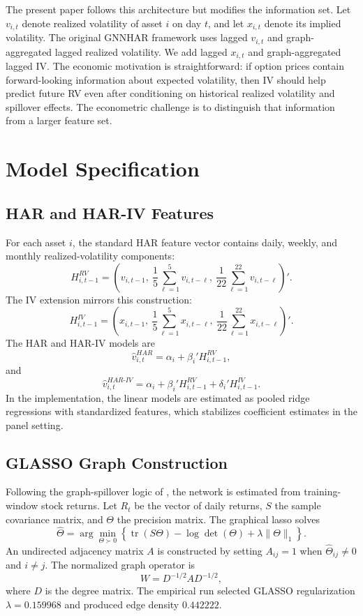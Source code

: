 \documentclass[11pt,a4paper]{article}
\begin{document}
The present paper follows this architecture but modifies the information set. Let \(v_{i,t}\) denote
realized volatility of asset \(i\) on day \(t\), and let \(x_{i,t}\) denote its implied volatility. The
original GNNHAR framework uses lagged \(v_{i,t}\) and graph-aggregated lagged realized
volatility. We add lagged \(x_{i,t}\) and graph-aggregated lagged IV. The economic motivation is
straightforward: if option prices contain forward-looking information about expected volatility,
then IV should help predict future RV even after conditioning on historical realized volatility
and spillover effects. The econometric challenge is to distinguish that information from a larger
feature set.

\section{Model Specification}

\subsection{HAR and HAR-IV Features}

For each asset \(i\), the standard HAR feature vector contains daily, weekly, and monthly
realized-volatility components:
\[
H^{RV}_{i,t-1}
= \left(v_{i,t-1},\ \frac{1}{5}\sum_{\ell=1}^{5}v_{i,t-\ell},\
\frac{1}{22}\sum_{\ell=1}^{22}v_{i,t-\ell}\right)' .
\]
The IV extension mirrors this construction:
\[
H^{IV}_{i,t-1}
= \left(x_{i,t-1},\ \frac{1}{5}\sum_{\ell=1}^{5}x_{i,t-\ell},\
\frac{1}{22}\sum_{\ell=1}^{22}x_{i,t-\ell}\right)' .
\]
The HAR and HAR-IV models are
\[
\widehat v_{i,t}^{HAR}
= \alpha_i + \beta_i' H^{RV}_{i,t-1},
\]
and
\[
\widehat v_{i,t}^{HAR\text{-}IV}
= \alpha_i + \beta_i' H^{RV}_{i,t-1} + \delta_i' H^{IV}_{i,t-1}.
\]
In the implementation, the linear models are estimated as pooled ridge regressions with
standardized features, which stabilizes coefficient estimates in the panel setting.

\subsection{GLASSO Graph Construction}

Following the graph-spillover logic of \citet{zhang2025gnnhar}, the network is estimated from
training-window stock returns. Let \(R_t\) be the vector of daily returns, \(S\) the sample
covariance matrix, and \(\Theta\) the precision matrix. The graphical lasso solves
\[
\widehat \Theta
= \arg\min_{\Theta \succ 0}
\left\{\operatorname{tr}(S\Theta) - \log\det(\Theta)
+ \lambda \|\Theta\|_1\right\}.
\]
An undirected adjacency matrix \(A\) is constructed by setting \(A_{ij}=1\) when
\(\widehat\Theta_{ij}\neq 0\) and \(i \neq j\). The normalized graph operator is
\[
W = D^{-1/2} A D^{-1/2},
\]
where \(D\) is the degree matrix. The empirical run selected GLASSO regularization
\(\lambda=0.159968\) and produced edge density \(0.442222\).
\end{document}
